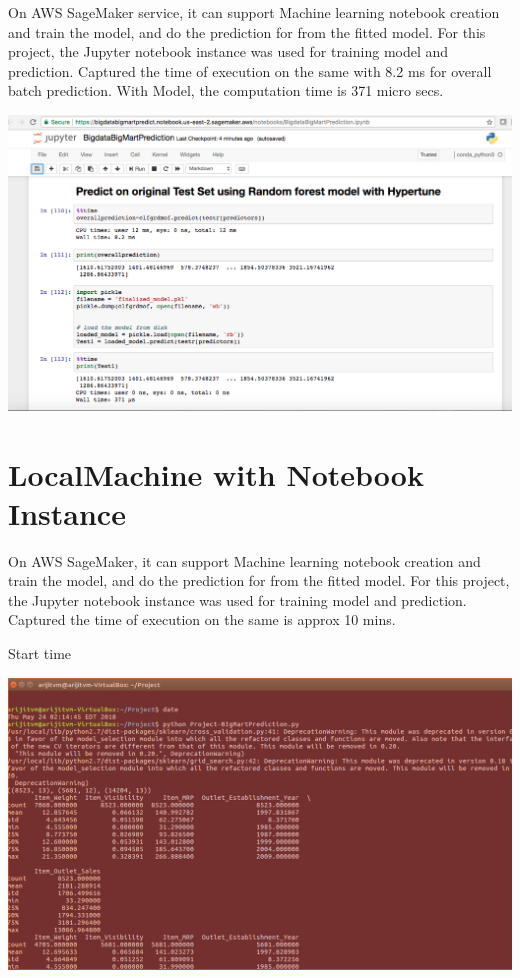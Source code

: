On AWS SageMaker service, it can support Machine learning notebook creation 
and train the model, and do the prediction for from the fitted model. For this 
project, the Jupyter notebook instance was used for training model and 
prediction. Captured the time of execution on the same with 8.2 ms for overall 
batch prediction. With Model, the computation time is 371 micro secs.


\includegraphics[width=\columnwidth]{Images/AWSnotebookscreenshot.png}


\section{LocalMachine with Notebook Instance}

On AWS SageMaker, it can support Machine learning notebook creation and 
train the model, and do the prediction for from the fitted model. For this 
project, the Jupyter notebook instance was used for training model and 
prediction. Captured the time of execution on the same is approx 10 mins.

Start time

\includegraphics[width=\columnwidth]{Images/Starttimelocal.png}



